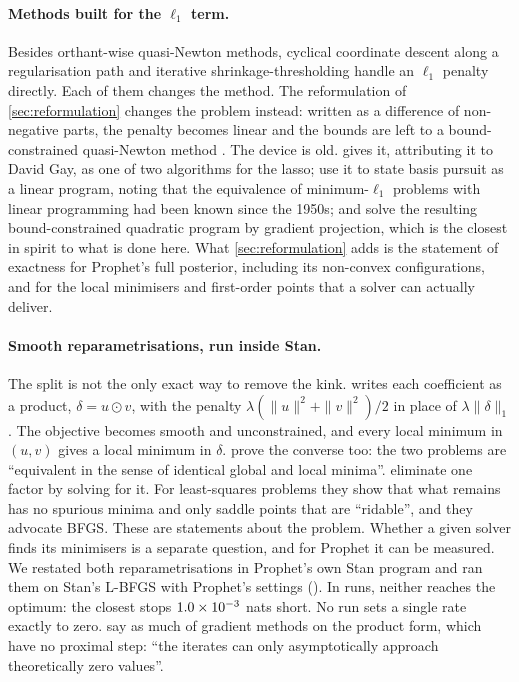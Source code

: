 \paragraph{Methods built for the $\ell_1$ term.}
Besides orthant-wise quasi-Newton methods, cyclical coordinate descent along a
regularisation path \citep{friedman2010regularization} and iterative
shrinkage-thresholding \citep{beck2009fast} handle an $\ell_1$ penalty directly.
Each of them changes the method. The reformulation of \cref{sec:reformulation}
changes the problem instead: written as a difference of non-negative parts, the
penalty becomes linear and the bounds are left to a bound-constrained quasi-Newton
method \citep[L-BFGS-B;][]{byrd1995limited}. The device is old.
\citet[Section~6]{tibshirani1996regression} gives it, attributing it to David Gay,
as one of two algorithms for the lasso; \citet{chen2001atomic} use it to state basis
pursuit as a linear program, noting that the equivalence of minimum-$\ell_1$
problems with linear programming had been known since the 1950s; and
\citet{figueiredo2007gradient} solve the resulting bound-constrained quadratic
program by gradient projection, which is the closest in spirit to what is done
here. What \cref{sec:reformulation} adds is the statement of exactness for
Prophet's full posterior, including its non-convex configurations, and for the
local minimisers and first-order points that a solver can actually deliver.

\paragraph{Smooth reparametrisations, run inside Stan.}
The split is not the only exact way to remove the kink. \citet{hoff2017lasso} writes
each coefficient as a product, $\delta = u \odot v$, with the penalty
$\lambda(\|u\|^2 + \|v\|^2)/2$ in place of $\lambda\|\delta\|_1$. The objective becomes
smooth and unconstrained, and every local minimum in $(u, v)$ gives a local minimum in
$\delta$. \citet{kolb2026smoothing} prove the converse too: the two problems are
``equivalent in the sense of identical global and local minima''.
\citet{poon2021smooth} eliminate one factor by solving for it. For least-squares
problems they show that what remains has no spurious minima and only saddle points
that are ``ridable'', and they advocate BFGS. These are statements about the problem.
Whether a given solver finds its minimisers is a separate question, and for Prophet it
can be measured. We restated both reparametrisations in Prophet's own Stan program and
ran them on Stan's L-BFGS with Prophet's settings
(). In \InsideRuns{} runs, neither reaches the
optimum: the closest stops $1.0\times10^{-3}$ nats short. No run sets a single rate exactly
to zero. \citet{kolb2026smoothing} say as much of gradient methods on the product form,
which have no proximal step: ``the iterates can only asymptotically approach
theoretically zero values''.

